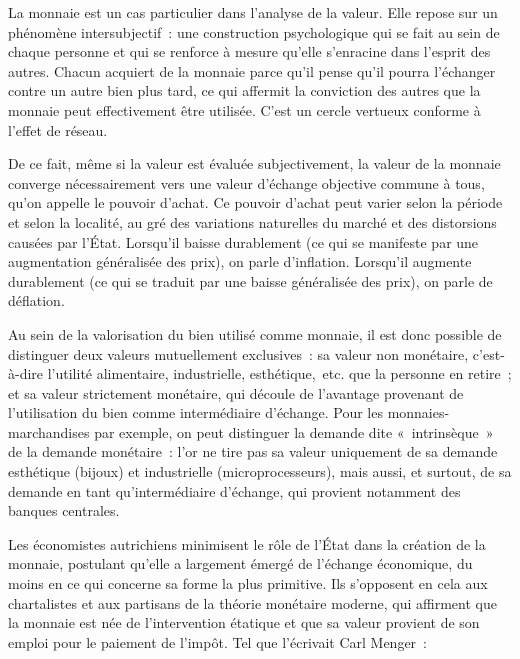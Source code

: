 
La monnaie est un cas particulier dans l'analyse de la valeur. Elle repose sur un phénomène intersubjectif~: une construction psychologique qui se fait au sein de chaque personne et qui se renforce à mesure qu'elle s'enracine dans l'esprit des autres. Chacun acquiert de la monnaie parce qu'il pense qu'il pourra l'échanger contre un autre bien plus tard, ce qui affermit la conviction des autres que la monnaie peut effectivement être utilisée. C'est un cercle vertueux conforme à l'effet de réseau.

De ce fait, même si la valeur est évaluée subjectivement, la valeur de la monnaie converge nécessairement vers une valeur d'échange objective commune à tous, qu'on appelle le pouvoir d'achat. Ce pouvoir d'achat peut varier selon la période et selon la localité, au gré des variations naturelles du marché et des distorsions causées par l'État. Lorsqu'il baisse durablement (ce qui se manifeste par une augmentation généralisée des prix), on parle d'inflation. Lorsqu'il augmente durablement (ce qui se traduit par une baisse généralisée des prix), on parle de déflation.

Au sein de la valorisation du bien utilisé comme monnaie, il est donc possible de distinguer deux valeurs mutuellement exclusives~: sa valeur non monétaire, c'est-à-dire l'utilité alimentaire, industrielle, esthétique,~etc. que la personne en retire~; et sa valeur strictement monétaire, qui découle de l'avantage provenant de l'utilisation du bien comme intermédiaire d'échange. Pour les monnaies-marchandises par exemple, on peut distinguer la demande dite «~intrinsèque~» de la demande monétaire~: l'or ne tire pas sa valeur uniquement de sa demande esthétique (bijoux) et industrielle (microprocesseurs), mais aussi, et surtout, de sa demande en tant qu'intermédiaire d'échange, qui provient notamment des banques centrales.


Les économistes autrichiens minimisent le rôle de l'État dans la création de la monnaie, postulant qu'elle a largement émergé de l'échange économique, du moins en ce qui concerne sa forme la plus primitive. Ils s'opposent en cela aux chartalistes et aux partisans de la théorie monétaire moderne, qui affirment que la monnaie est née de l'intervention étatique et que sa valeur provient de son emploi pour le paiement de l'impôt. Tel que l'écrivait Carl Menger~:

